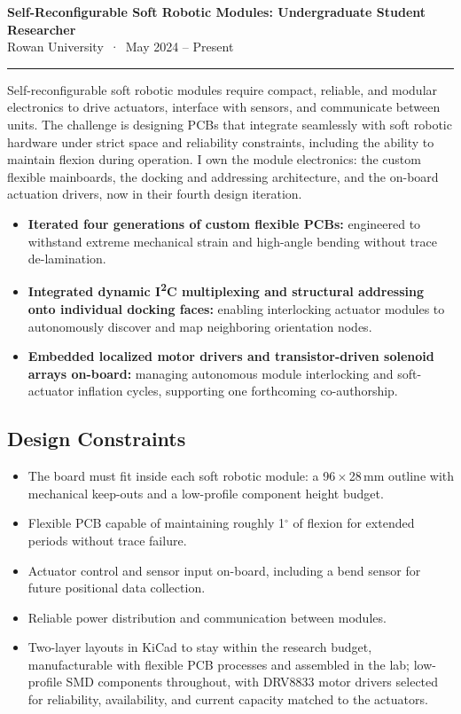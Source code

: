 \documentclass[10pt,letterpaper]{article}
\begin{document}

{\large\bfseries Self-Reconfigurable Soft Robotic Modules: Undergraduate Student Researcher}\\
Rowan University \,·\, May 2024 -- Present
\vspace{2pt}
\hrule
\vspace{4pt}

Self-reconfigurable soft robotic modules require compact, reliable, and
modular electronics to drive actuators, interface with sensors, and
communicate between units. The challenge is designing PCBs that integrate
seamlessly with soft robotic hardware under strict space and reliability
constraints, including the ability to maintain flexion during operation.
I own the module electronics: the custom flexible mainboards, the docking
and addressing architecture, and the on-board actuation drivers, now in
their fourth design iteration.

\begin{itemize}
  \item \textbf{Iterated four generations of custom flexible PCBs:}
        engineered to withstand extreme mechanical strain and high-angle
        bending without trace de-lamination.
  \item \textbf{Integrated dynamic I\textsuperscript{2}C multiplexing and
        structural addressing onto individual docking faces:} enabling
        interlocking actuator modules to autonomously discover and map
        neighboring orientation nodes.
  \item \textbf{Embedded localized motor drivers and transistor-driven
        solenoid arrays on-board:} managing autonomous module interlocking
        and soft-actuator inflation cycles, supporting one forthcoming
        co-authorship.
\end{itemize}

\subsection*{Design Constraints}

\begin{itemize}
  \item The board must fit inside each soft robotic module: a
        96\,$\times$\,28\,mm outline with mechanical keep-outs and a
        low-profile component height budget.
  \item Flexible PCB capable of maintaining roughly 1$^{\circ}$ of flexion
        for extended periods without trace failure.
  \item Actuator control and sensor input on-board, including a bend
        sensor for future positional data collection.
  \item Reliable power distribution and communication between modules.
  \item Two-layer layouts in KiCad to stay within the research budget,
        manufacturable with flexible PCB processes and assembled in the
        lab; low-profile SMD components throughout, with DRV8833 motor
        drivers selected for reliability, availability, and current
        capacity matched to the actuators.
\end{itemize}
\end{document}
